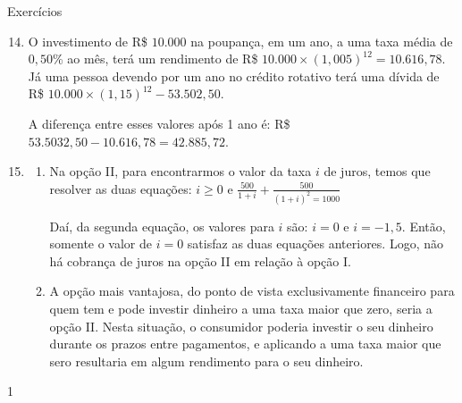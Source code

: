 \begin{answer}{Exercícios}
{\exerciselist

  \begin{enumerate}\setcounter{enumi}{13}
    \item O investimento de R\$ $10.000$ na poupança, em um ano, a uma taxa média de $0{,}50$\% ao mês, terá um rendimento de R\$ $10.000\times (1{,}005)^12=10.616{,}78$. Já uma pessoa devendo por um ano no crédito rotativo terá uma dívida de R\$ $10.000\times(1{,}15)^12-53.502{,}50$.

    A diferença entre esses valores após 1 ano é: R\$ $53.5032{,}50-10.616{,}78=42.885{,}72$. 

    \item
    \begin{enumerate}
      \item Na opção II, para encontrarmos o valor da taxa $i$ de juros, temos que resolver as duas equações: $i\geq0$ e $\displaystyle\frac{500}{1+i}+\frac{500}{(1+i)^2=1000}$

      Daí, da segunda equação, os valores para $i$ são: $i=0$ e $i=-1{,}5$. Então, somente o valor de $i=0$ satisfaz as duas equações anteriores. Logo, não há cobrança de juros na opção II em relação à opção I.

      \item A opção mais vantajosa, do ponto de vista exclusivamente financeiro para quem tem e pode investir dinheiro a uma taxa  maior que zero, seria a opção II. Nesta situação, o consumidor poderia investir o seu dinheiro durante os prazos entre pagamentos, e aplicando a uma taxa maior que sero resultaria em algum rendimento para o seu dinheiro.
    \end{enumerate}
  \end{enumerate}
}{1}
\end{answer}
\clearmargin
